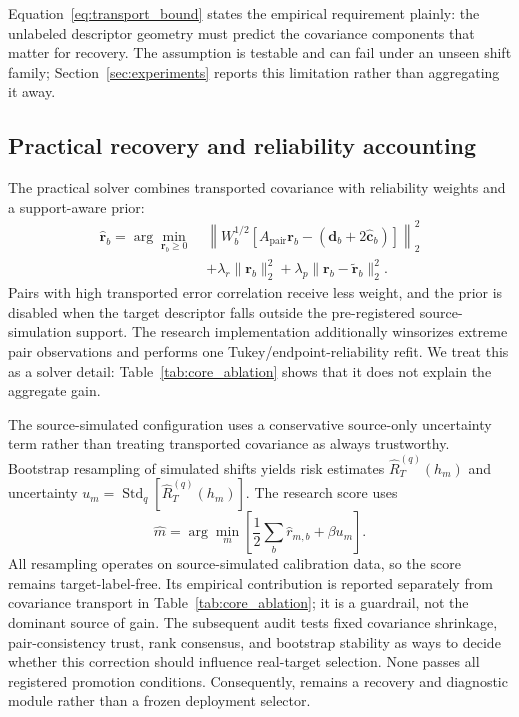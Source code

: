 Equation~\eqref{eq:transport_bound} states the empirical requirement plainly:
the unlabeled descriptor geometry must predict the covariance components that
matter for recovery. The assumption is testable and can fail under an unseen
shift family; Section~\ref{sec:experiments} reports this limitation rather than
aggregating it away.

\subsection{Practical recovery and reliability accounting}

The practical solver combines transported covariance with reliability weights
and a support-aware prior:
\begin{align}
  \widehat{\mathbf r}_b
  =\arg\min_{\mathbf r_b\geq0}\;&
  \left\lVert W_b^{1/2}
  \left[A_{\mathrm{pair}}\mathbf r_b-
  (\mathbf d_b+2\widehat{\mathbf c}_b)\right]
  \right\rVert_2^2 \\
  &+\lambda_r\lVert\mathbf r_b\rVert_2^2
  +\lambda_p\lVert\mathbf r_b-\widetilde{\mathbf r}_b\rVert_2^2.
  \label{eq:practical_recovery}
\end{align}
Pairs with high transported error correlation receive less weight, and the
prior is disabled when the target descriptor falls outside the pre-registered
source-simulation support. The research implementation additionally winsorizes
extreme pair observations and performs one Tukey/endpoint-reliability refit.
We treat this as a solver detail: Table~\ref{tab:core_ablation} shows that it
does not explain the aggregate gain.

The source-simulated configuration uses a conservative source-only uncertainty
term rather than treating transported covariance as always trustworthy. Bootstrap
resampling of simulated shifts yields risk estimates
$\widehat R_T^{(q)}(h_m)$ and uncertainty
$u_m=\operatorname{Std}_q[\widehat R_T^{(q)}(h_m)]$. The research score uses
\begin{equation}
  \widehat m=\arg\min_m
  \left[\frac{1}{2}\sum_b\widehat r_{m,b}+\beta u_m\right].
  \label{eq:ucb}
\end{equation}
All resampling operates on source-simulated calibration data, so the score
remains target-label-free. Its empirical contribution is reported separately
from covariance transport in Table~\ref{tab:core_ablation}; it is a guardrail,
not the dominant source of gain. The subsequent audit tests fixed covariance
shrinkage, pair-consistency trust, rank consensus, and bootstrap stability as
ways to decide whether this correction should influence real-target
selection. None passes all registered promotion conditions. Consequently,
\method remains a recovery and diagnostic module rather than a frozen
deployment selector.

